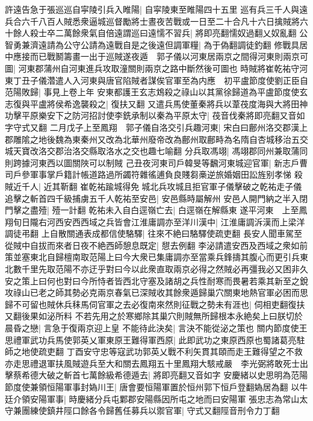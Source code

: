 許遠告急于張巡巡自寜陵引兵入睢陽|{
	自寜陵東至睢陽四十五里}
巡有兵三千人與遠兵合六千八百人賊悉衆逼城巡督勵將士晝夜苦戰或一日至二十合凡十六日擒賊將六十餘人殺士卒二萬餘衆氣自倍遠謂巡曰遠懦不習兵|{
	將即亮翻懦奴過翻乂奴亂翻}
公智勇兼濟遠請為公守公請為遠戰自是之後遠但調軍糧|{
	為于偽翻調徒釣翻}
修戰具居中應接而已戰鬭籌畫一出于巡賊遂夜遁　郭子儀以河東居兩京之間得河東則兩京可圖|{
	河東郡蒲州自河東進兵攻取潼關則兩京之路中斷然後可圖也}
時賊將崔乾祐守河東丁丑子儀濳遣人入河東與唐官陷賊者謀俟官軍至為内應　初平盧節度使劉正臣自范陽敗歸|{
	事見上卷上年}
安東都護王玄志鴆殺之祿山以其黨徐歸道為平盧節度使玄志復與平盧將侯希逸襲殺之|{
	復扶又翻}
又遣兵馬使董秦將兵以葦茷度海與大將田神功擊平原樂安下之防河招討使李銑承制以秦為平原太守|{
	茷音伐秦將即亮翻又音如字守式又翻}
二月戊子上至鳳翔　郭子儀自洛交引兵趣河東|{
	宋白曰鄜州洛交郡漢上郡雕隂之地後魏為東秦州又改為北華州廢帝改為鄜州取鄜畤為名隋自杏城移治五交城天寶改洛交郡治洛交縣取洛水之交也趣七喻翻}
分兵取馮翊|{
	馮翊郡同州兼取蒲同則跨據河東西以圖關陜可以制賊}
己丑夜河東司戶韓旻等飜河東城迎官軍|{
	新志戶曹司戶參軍事掌戶籍計帳道路過所蠲符雜徭逋負良賤芻槀逆旅婚姻田訟旌别孝悌}
殺賊近千人|{
	近其靳翻}
崔乾祐踰城得免城北兵攻城且拒官軍子儀擊破之乾祐走子儀追擊之斬首四千級捕虜五千人乾祐至安邑|{
	安邑縣時屬解州}
安邑人開門納之半入閉門擊之盡殪|{
	殪一計翻}
乾祐未入自白逕嶺亡去|{
	白逕嶺在解縣東}
遂平河東　上至鳳翔旬日隴右河西安西西域之兵皆會江淮庸調亦至洋川漢中|{
	江淮庸調泝漢而上梁洋調徒弔翻}
上自散關通表成都信使駱驛|{
	往來不絶曰駱驛使疏吏翻}
長安人聞車駕至從賊中自拔而來者日夜不絶西師憩息既定|{
	憇去例翻}
李泌請遣安西及西域之衆如前策並塞東北自歸檀南取范陽上曰今大衆已集庸調亦至當乘兵鋒擣其腹心而更引兵東北數千里先取范陽不亦迂乎對曰今以此衆直取兩京必得之然賊必再彊我必又困非久安之策上曰何也對曰今所恃者皆西北守塞及諸胡之兵性耐寒而畏暑若乘其新至之銳攻祿山已老之師其勢必克兩京春氣已深賊收其餘衆遁歸巢穴關東地熱官軍必困而思歸不可留也賊休兵秣馬伺官軍之去必復南來然則征戰之勢未有涯也|{
	伺相吏翻復扶又翻後果如泌所料}
不若先用之於寒鄉除其巢穴則賊無所歸根本永絶矣上曰朕切於晨昏之戀|{
	言急于復兩京迎上皇}
不能待此決矣|{
	言決不能從泌之策也}
關内節度使王思禮軍武功兵馬使郭英乂軍東原王難得軍西原|{
	此即武功之東原西原也蜀諸葛亮駐師之地使疏吏翻}
丁酉安守忠等寇武功郭英乂戰不利矢貫其頤而走王難得望之不救亦走思禮退軍扶風賊遊兵至大和關去鳳翔五十里鳳翔大駭戒嚴　李光弼將敢死士出擊蔡希德大破之斬首七萬餘級希德遁去|{
	將即亮翻又音如字}
安慶緒以史思明為范陽節度使兼領恒陽軍事封媯川王|{
	唐會要恒陽軍置於恒州郭下恒戶登翻媯居為翻}
以牛廷介領安陽軍事|{
	時慶緒分兵屯鄴郡安陽縣因所屯之地而曰安陽軍}
張忠志為常山太守兼團練使鎮井陘口餘各令歸舊任募兵以禦官軍|{
	守式又翻陘音刑令力丁翻}
